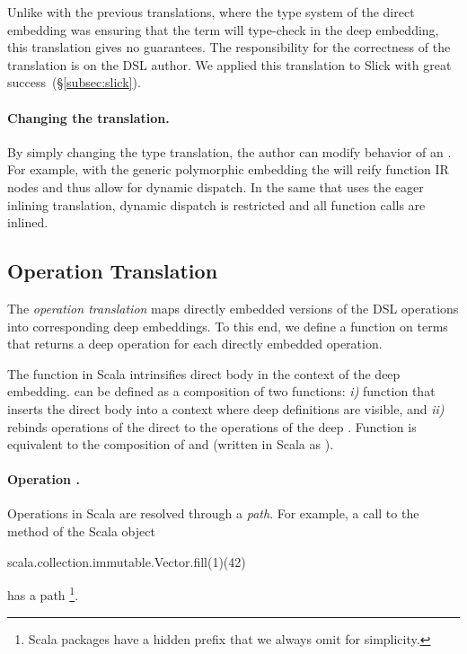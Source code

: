 Unlike with the previous translations, where the type system of the direct embedding was
ensuring that the term will type-check in the deep embedding, this translation gives no guarantees. The
responsibility for the correctness of the translation is on the DSL author. We applied this translation to Slick
\cite{slick} with great success~(\S \ref{subsec:slick}).

\paragraph{Changing the translation.} By simply changing the type translation, the \edsl author can modify behavior of an \edsl.  For example, with the generic polymorphic embedding the \edsl will reify function IR nodes and thus allow for dynamic dispatch. In the same \edsl that uses the eager inlining translation, dynamic dispatch is restricted and all function calls are inlined.

\subsection{Operation Translation}
\label{sec:operation-translation}

The \emph{operation translation} maps directly embedded versions of the
  DSL operations into corresponding deep embeddings. To this end, we define a
  function  on terms that returns a deep operation for each directly
  embedded operation.

The  function in Scala intrinsifies direct \edsl body in the context of the deep embedding.
  can be defined as a composition of two functions: \emph{i)} function  that inserts the direct \edsl body
  into a context where deep \edsl definitions are visible, and \emph{ii)} 
  rebinds operations of the direct \edsl to the operations of the deep \edsl. Function  is equivalent to
  the composition of  and  (written in Scala as ).

\paragraph{Operation .} Operations in Scala are resolved through a \emph{path}. For example, a call to the  method
  of the Scala object \begin{lstparagraph}
scala.collection.immutable.Vector.fill(1)(42)
\end{lstparagraph}
  has a path \footnote{Scala packages have a hidden prefix  that we always omit for simplicity.}.

